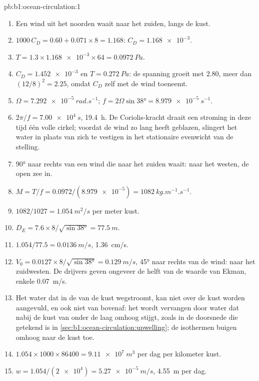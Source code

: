 \begin{solution}{pb:b1:ocean-circulation:1}
\begin{enumerate}
  \item Een wind uit het noorden waait naar het zuiden, langs de kust.
  \item $1000\,C_D = 0.60 + 0.071 \times 8 = 1.168$: $C_D = \num{1.168e-3}$.
  \item $T = 1.3 \times \num{1.168e-3} \times 64 = \qty{0.0972}{Pa}$.
  \item $C_D = \num{1.452e-3}$ en $T = \qty{0.272}{Pa}$: de spanning groeit met $2.80$,
        meer dan $(12/8)^2 = 2.25$, omdat $C_D$ zelf met de wind toeneemt.
  \item $\Omega = \qty{7.292e-5}{rad.s^{-1}}$; $f = 2\Omega\sin\ang{38} =
        \qty{8.979e-5}{s^{-1}}$.
  \item $2\pi/f = \qty{7.00e4}{s}$, \qty{19.4}{h}. De Coriolis-kracht draait een stroming in deze tijd één volle cirkel; voordat de wind zo lang heeft geblazen, slingert het water in plaats van zich te vestigen in het stationaire evenwicht van de stelling.
  \item \ang{90} naar rechts van een wind die naar het zuiden waait: naar het westen, de open zee in.
  \item $M = T/f = 0.0972/(\num{8.979e-5}) = \qty{1082}{kg.m^{-1}.s^{-1}}$.
  \item $1082/1027 = \qty{1.054}{m^2/s}$ per meter kust.
  \item $D_E = 7.6 \times 8/\sqrt{\sin\ang{38}} = \qty{77.5}{m}$.
  \item $1.054/77.5 = \qty{0.0136}{m/s}$, \qty{1.36}{cm/s}.
  \item $V_0 = 0.0127 \times 8/\sqrt{\sin\ang{38}} = \qty{0.129}{m/s}$, \ang{45} naar rechts van de wind: naar het zuidwesten. De drijvers geven ongeveer de helft van de waarde van Ekman, enkele \qty{0.07}{m/s}.
  \item Het water dat in de  van de kust wegstroomt, kan niet over de kust worden aangevuld, en ook niet van bovenaf: het wordt vervangen door water dat nabij de kust van onder de laag omhoog stijgt,
        zoals in de doorsnede die getekend is in \cref{sec:b1:ocean-circulation:upwelling}; de isothermen buigen omhoog naar de kust toe.
  \item $1.054 \times 1000 \times 86400 = \qty{9.11e7}{m^3}$ per dag per kilometer kust.
  \item $w = 1.054/(\num{2e4}) = \qty{5.27e-5}{m/s}$, \qty{4.55}{m} per dag.

\end{enumerate}
\end{solution}
